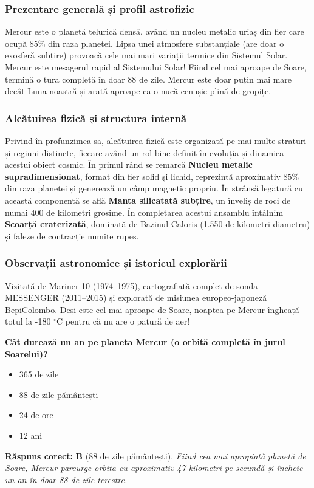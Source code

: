 \subsubsection*{Prezentare generală și profil astrofizic}
Mercur este o planetă telurică densă, având un nucleu metalic uriaș din fier care ocupă 85\% din raza planetei. Lipsa unei atmosfere substanțiale (are doar o exosferă subțire) provoacă cele mai mari variații termice din Sistemul Solar. Mercur este mesagerul rapid al Sistemului Solar! Fiind cel mai aproape de Soare, termină o tură completă în doar 88 de zile. Mercur este doar puțin mai mare decât Luna noastră și arată aproape ca o nucă cenușie plină de gropițe.

\subsubsection*{Alcătuirea fizică și structura internă}
Privind în profunzimea sa, alcătuirea fizică este organizată pe mai multe straturi și regiuni distincte, fiecare având un rol bine definit în evoluția și dinamica acestui obiect cosmic. În primul rând se remarcă \textbf{Nucleu metalic supradimensionat}, format din fier solid și lichid, reprezintă aproximativ 85\% din raza planetei și generează un câmp magnetic propriu. În strânsă legătură cu această componentă se află \textbf{Manta silicatată subțire}, un înveliș de roci de numai 400 de kilometri grosime. În completarea acestui ansamblu întâlnim \textbf{Scoarță craterizată}, dominată de Bazinul Caloris (1.550 de kilometri diametru) și faleze de contracție numite rupes.

\subsubsection*{Observații astronomice și istoricul explorării}
Vizitată de Mariner 10 (1974--1975), cartografiată complet de sonda MESSENGER (2011--2015) și explorată de misiunea europeo-japoneză BepiColombo. Deși este cel mai aproape de Soare, noaptea pe Mercur îngheață totul la -180 $^\circ$C pentru că nu are o pătură de aer!

\vspace{6pt}
\begin{tcolorbox}[orbitarquiz, title={\textbf{Întrebare de verificare \#2: Mercur}}]
\textbf{Cât durează un an pe planeta Mercur (o orbită completă în jurul Soarelui)?}
\begin{itemize}[leftmargin=2.2em, itemsep=2pt, topsep=4pt]
  \item[$\square$ \textbf{A.}] 365 de zile
  \item[$\square$ \textbf{B.}] 88 de zile pământești
  \item[$\square$ \textbf{C.}] 24 de ore
  \item[$\square$ \textbf{D.}] 12 ani
\end{itemize}
\vspace{2pt}
{\footnotesize\color{orbitarMuted}\textbf{Răspuns corect:} \textbf{B} (88 de zile pământești). \emph{Fiind cea mai apropiată planetă de Soare, Mercur parcurge orbita cu aproximativ 47 kilometri pe secundă și încheie un an în doar 88 de zile terestre.}}
\end{tcolorbox}
\clearpage


